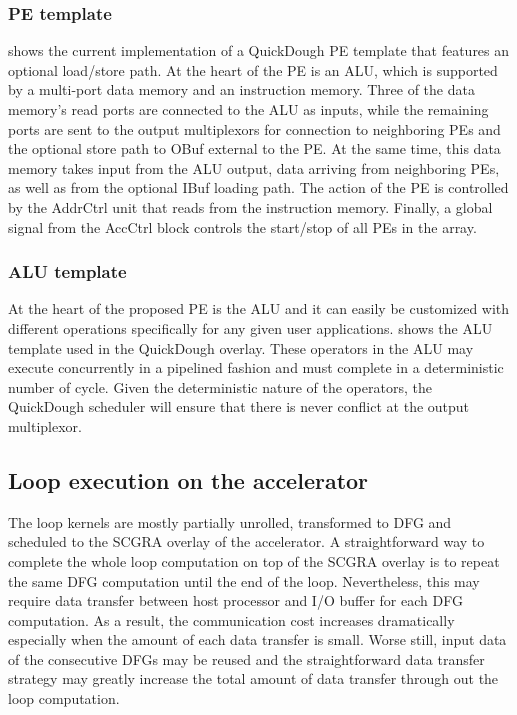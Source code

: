 \subsubsection{PE template}
 shows the current implementation of a QuickDough 
PE template that features an optional load/store path. 
At the heart of the PE is an ALU, which is supported by a multi-port 
data memory and an instruction memory.
Three of the data memory's read ports are connected to the ALU as inputs, 
while the remaining ports are sent to the output multiplexors for 
connection to neighboring PEs and the optional store path to 
OBuf external to the PE. At the same time, this data memory takes 
input from the ALU output, data arriving from neighboring PEs, as well 
as from the optional IBuf loading path.
The action of the PE is controlled by the AddrCtrl unit that reads from the instruction memory.
Finally, a global signal from the AccCtrl block controls the start/stop of all PEs in the array.

\subsubsection{ALU template}
At the heart of the proposed PE is the ALU and it can easily be 
customized with different operations specifically for any given user 
applications.  shows the ALU template used 
in the QuickDough overlay. These operators in the ALU may execute 
concurrently in a pipelined fashion and must complete in a 
deterministic number of cycle. Given the deterministic nature of 
the operators, the QuickDough scheduler will 
ensure that there is never conflict at the output multiplexor.

\subsection{Loop execution on the accelerator}
The loop kernels are mostly partially unrolled, transformed to DFG and scheduled to the SCGRA
overlay of the accelerator. A straightforward way to complete the whole loop computation on top of the SCGRA
overlay is to repeat the same DFG computation until the end of the loop. Nevertheless, this may
require data transfer between host processor and I/O buffer for each DFG computation. As a result,
the communication cost increases dramatically especially when the amount of each data transfer is
small. Worse still, input data of the consecutive DFGs may be reused and the straightforward
data transfer strategy may greatly increase the total amount of data transfer through out the loop
computation. 

